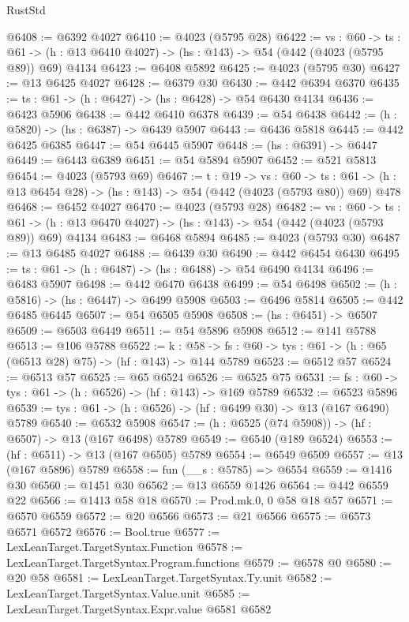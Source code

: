\begin{lexlean}{RustStd}
\begin{coremodule}
@6408 := @6392 @4027
@6410 := @4023 (@5795 @28)
@6422 := {vs : @60} ->
  {ts : @61} -> (h : @13 @6410 @4027) -> (hs : @143) -> @54 (@442 (@4023 (@5795 @89)) @69) @4134
@6423 := @6408 @5892
@6425 := @4023 (@5795 @30)
@6427 := @13 @6425 @4027
@6428 := @6379 @30
@6430 := @442 @6394 @6370
@6435 := {ts : @61} -> (h : @6427) -> (hs : @6428) -> @54 @6430 @4134
@6436 := @6423 @5906
@6438 := @442 @6410 @6378
@6439 := @54 @6438
@6442 := (h : @5820) -> (hs : @6387) -> @6439 @5907
@6443 := @6436 @5818
@6445 := @442 @6425 @6385
@6447 := @54 @6445 @5907
@6448 := (hs : @6391) -> @6447
@6449 := @6443 @6389
@6451 := @54 @5894 @5907
@6452 := @521 @5813
@6454 := @4023 (@5793 @69)
@6467 := {t : @19} ->
  {vs : @60} ->
  {ts : @61} -> (h : @13 @6454 @28) -> (hs : @143) -> @54 (@442 (@4023 (@5793 @80)) @69) @478
@6468 := @6452 @4027
@6470 := @4023 (@5793 @28)
@6482 := {vs : @60} ->
  {ts : @61} -> (h : @13 @6470 @4027) -> (hs : @143) -> @54 (@442 (@4023 (@5793 @89)) @69) @4134
@6483 := @6468 @5894
@6485 := @4023 (@5793 @30)
@6487 := @13 @6485 @4027
@6488 := @6439 @30
@6490 := @442 @6454 @6430
@6495 := {ts : @61} -> (h : @6487) -> (hs : @6488) -> @54 @6490 @4134
@6496 := @6483 @5907
@6498 := @442 @6470 @6438
@6499 := @54 @6498
@6502 := (h : @5816) -> (hs : @6447) -> @6499 @5908
@6503 := @6496 @5814
@6505 := @442 @6485 @6445
@6507 := @54 @6505 @5908
@6508 := (hs : @6451) -> @6507
@6509 := @6503 @6449
@6511 := @54 @5896 @5908
@6512 := @141 @5788
@6513 := @106 @5788
@6522 := {k : @58} ->
  {fs : @60} -> {tys : @61} -> (h : @65 (@6513 @28) @75) -> (hf : @143) -> @144 @5789
@6523 := @6512 @57
@6524 := @6513 @57
@6525 := @65 @6524
@6526 := @6525 @75
@6531 := {fs : @60} -> {tys : @61} -> (h : @6526) -> (hf : @143) -> @169 @5789
@6532 := @6523 @5896
@6539 := {tys : @61} -> (h : @6526) -> (hf : @6499 @30) -> @13 (@167 @6490) @5789
@6540 := @6532 @5908
@6547 := (h : @6525 (@74 @5908)) -> (hf : @6507) -> @13 (@167 @6498) @5789
@6549 := @6540 (@189 @6524)
@6553 := (hf : @6511) -> @13 (@167 @6505) @5789
@6554 := @6549 @6509
@6557 := @13 (@167 @5896) @5789
@6558 := fun (__s : @5785) => @6554
@6559 := @1416 @30
@6560 := @1451 @30
@6562 := @13 @6559 @1426
@6564 := @442 @6559 @22
@6566 := @1413 @58 @18
@6570 := Prod.mk.{0, 0} @58 @18 @57
@6571 := @6570 @6559
@6572 := @20 @6566
@6573 := @21 @6566
@6575 := @6573 @6571 @6572
@6576 := Bool.true
@6577 := LexLeanTarget.TargetSyntax.Function
@6578 := LexLeanTarget.TargetSyntax.Program.functions
@6579 := @6578 @0
@6580 := @20 @58
@6581 := LexLeanTarget.TargetSyntax.Ty.unit
@6582 := LexLeanTarget.TargetSyntax.Value.unit
@6585 := LexLeanTarget.TargetSyntax.Expr.value @6581 @6582

\end{coremodule}
\end{lexlean}

